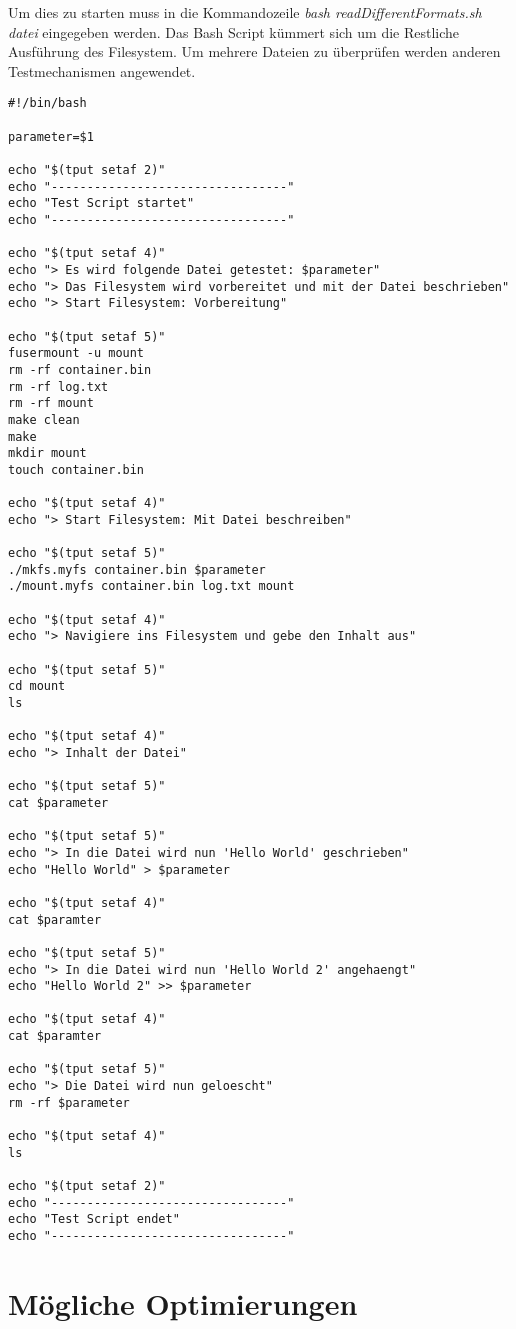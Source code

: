 Um dies zu starten muss in die Kommandozeile \textit{bash readDifferentFormats.sh datei} eingegeben werden. Das Bash Script kümmert sich um die Restliche Ausführung des Filesystem. Um mehrere Dateien zu überprüfen werden anderen Testmechanismen angewendet. 
\begin{lstlisting}
#!/bin/bash

parameter=$1

echo "$(tput setaf 2)"
echo "---------------------------------"
echo "Test Script startet"
echo "---------------------------------"

echo "$(tput setaf 4)"
echo "> Es wird folgende Datei getestet: $parameter"
echo "> Das Filesystem wird vorbereitet und mit der Datei beschrieben"
echo "> Start Filesystem: Vorbereitung"

echo "$(tput setaf 5)"
fusermount -u mount
rm -rf container.bin
rm -rf log.txt
rm -rf mount
make clean
make
mkdir mount
touch container.bin

echo "$(tput setaf 4)"
echo "> Start Filesystem: Mit Datei beschreiben"

echo "$(tput setaf 5)"
./mkfs.myfs container.bin $parameter
./mount.myfs container.bin log.txt mount

echo "$(tput setaf 4)"
echo "> Navigiere ins Filesystem und gebe den Inhalt aus"

echo "$(tput setaf 5)"
cd mount
ls

echo "$(tput setaf 4)"
echo "> Inhalt der Datei"

echo "$(tput setaf 5)"
cat $parameter

echo "$(tput setaf 5)"
echo "> In die Datei wird nun 'Hello World' geschrieben"
echo "Hello World" > $parameter

echo "$(tput setaf 4)"
cat $paramter

echo "$(tput setaf 5)"
echo "> In die Datei wird nun 'Hello World 2' angehaengt"
echo "Hello World 2" >> $parameter

echo "$(tput setaf 4)"
cat $paramter

echo "$(tput setaf 5)"
echo "> Die Datei wird nun geloescht"
rm -rf $parameter

echo "$(tput setaf 4)"
ls

echo "$(tput setaf 2)"
echo "---------------------------------"
echo "Test Script endet"
echo "---------------------------------"
\end{lstlisting}

\newpage

\section{Mögliche Optimierungen}

